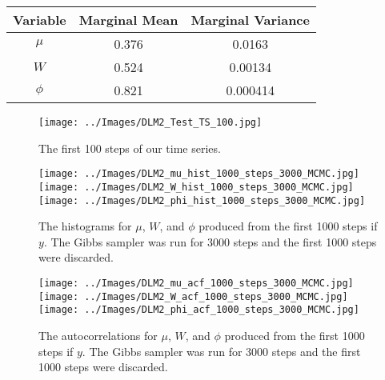 \documentclass{article}
\begin{document}
\begin{center}
\begin{tabular}{c | c | c}
Variable & Marginal Mean & Marginal Variance \\
\hline
$\mu$ & 0.376 & 0.0163 \\
$W$ & 0.524 & 0.00134 \\
$\phi$ & 0.821 & 0.000414 \\
\end{tabular}
\end{center}

\begin{figure}[!h]
\begin{center}
\texttt{[image: ../Images/DLM2\_Test\_TS\_100.jpg]}
\end{center}
\caption{The first 100 steps of our time series.}
\end{figure}

\begin{figure}[!h]
\begin{center}
\texttt{[image: ../Images/DLM2\_mu\_hist\_1000\_steps\_3000\_MCMC.jpg]}
\texttt{[image: ../Images/DLM2\_W\_hist\_1000\_steps\_3000\_MCMC.jpg]}
\texttt{[image: ../Images/DLM2\_phi\_hist\_1000\_steps\_3000\_MCMC.jpg]}
\end{center}
\label{DLM2:histograms}
\caption{The histograms for $\mu$, $W$, and $\phi$ produced from the first 1000 steps if $y$.  The Gibbs sampler was run for 3000 steps and the first 1000 steps were discarded.}
\end{figure}

\begin{figure}[!h]
\begin{center}
\texttt{[image: ../Images/DLM2\_mu\_acf\_1000\_steps\_3000\_MCMC.jpg]}
\texttt{[image: ../Images/DLM2\_W\_acf\_1000\_steps\_3000\_MCMC.jpg]}
\texttt{[image: ../Images/DLM2\_phi\_acf\_1000\_steps\_3000\_MCMC.jpg]}
\end{center}
\caption{The autocorrelations for $\mu$, $W$, and $\phi$ produced from the first 1000 steps if $y$.  The Gibbs sampler was run for 3000 steps and the first 1000 steps were discarded.}
\end{figure}
\end{document}
